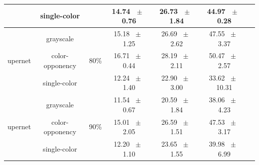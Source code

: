 \begin{table}[h]
\begin{tabular}{@{}lccc ccc@{}}
    & single-color & & 14.74 ~$\pm$~ 0.76 & 26.73 ~$\pm$~ 1.84 & 44.97 ~$\pm$~ 0.28 \\
    \midrule
    \multirow{3}{*}{upernet} & grayscale & \multirow{3}{*}{80\%} & 15.18 ~$\pm$~ 1.25 & 26.69 ~$\pm$~ 2.62 & 47.55 ~$\pm$~ 3.37 \\
    & color-opponency & & 16.71 ~$\pm$~ 0.44 & 28.19 ~$\pm$~ 2.11 & 50.47 ~$\pm$~ 2.57 \\
    & single-color & & 12.24 ~$\pm$~ 1.40 & 22.90 ~$\pm$~ 3.00 & 33.62 ~$\pm$~ 10.31 \\
    \midrule
    \multirow{3}{*}{upernet} & grayscale & \multirow{3}{*}{90\%} & 11.54 ~$\pm$~ 0.67 & 20.59 ~$\pm$~ 1.84 & 38.06 ~$\pm$~ 4.23 \\
    & color-opponency & & 15.01 ~$\pm$~ 2.05 & 26.59 ~$\pm$~ 1.51 & 47.53 ~$\pm$~ 3.17 \\
    & single-color & & 12.20 ~$\pm$~ 1.10 & 23.65 ~$\pm$~ 1.55 & 39.98 ~$\pm$~ 6.99 \\
    \midrule
    \bottomrule
  \end{tabular}
  \label{tab:sparse_upernet_dark_zurich}
\end{table}